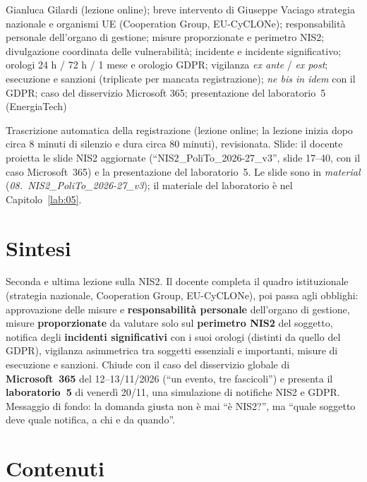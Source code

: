   {Gianluca Gilardi (lezione online); breve intervento di Giuseppe Vaciago}
  {strategia nazionale e organismi UE (Cooperation Group, EU-CyCLONe); responsabilità personale
   dell'organo di gestione; misure proporzionate e perimetro NIS2; divulgazione coordinata delle
   vulnerabilità; incidente e incidente significativo; orologi 24 h / 72 h / 1 mese e orologio GDPR;
   vigilanza \emph{ex ante} / \emph{ex post}; esecuzione e sanzioni (triplicate per mancata
   registrazione); \emph{ne bis in idem} con il GDPR; caso del disservizio Microsoft 365; presentazione
   del laboratorio~5 (EnergiaTech)}
\label{lez:2026-11-16}

\begin{nota}[Fonte]
Trascrizione automatica della registrazione (lezione online; la lezione inizia dopo circa 8 minuti di
silenzio e dura circa 80 minuti), revisionata. Slide: il docente proietta le slide NIS2 aggiornate
(``NIS2\_PoliTo\_2026-27\_v3'', slide 17--40, con il caso Microsoft~365) e la presentazione del
laboratorio~5. Le slide sono in \emph{material} (\emph{08.~NIS2\_PoliTo\_2026-27\_v3}); il materiale del
laboratorio è nel Capitolo~\ref{lab:05}.
\end{nota}

\section{Sintesi}
Seconda e ultima lezione sulla NIS2. Il docente completa il quadro istituzionale (strategia nazionale,
Cooperation Group, EU-CyCLONe), poi passa agli obblighi: approvazione delle misure e
\textbf{responsabilità personale} dell'organo di gestione, misure \textbf{proporzionate} da valutare
solo sul \textbf{perimetro NIS2} del soggetto, notifica degli \textbf{incidenti significativi} con i suoi
orologi (distinti da quello del GDPR), vigilanza asimmetrica tra soggetti essenziali e importanti,
misure di esecuzione e sanzioni. Chiude con il caso del disservizio globale di \textbf{Microsoft~365}
del 12--13/11/2026 (``un evento, tre fascicoli'') e presenta il \textbf{laboratorio~5} di venerdì
20/11, una simulazione di notifiche NIS2 e GDPR. Messaggio di fondo: la domanda giusta non è mai ``è
NIS2?'', ma ``quale soggetto deve quale notifica, a chi e da quando''.

\section{Contenuti}

